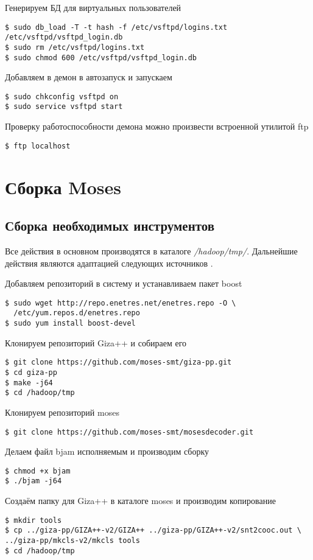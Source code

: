 Генерируем БД для виртуальных пользователей
\begin{lstlisting}
$ sudo db_load -T -t hash -f /etc/vsftpd/logins.txt /etc/vsftpd/vsftpd_login.db
$ sudo rm /etc/vsftpd/logins.txt
$ sudo chmod 600 /etc/vsftpd/vsftpd_login.db
\end{lstlisting}

Добавляем в демон в автозапуск и запускаем
\begin{lstlisting}
$ sudo chkconfig vsftpd on
$ sudo service vsftpd start
\end{lstlisting}

Проверку работоспособности демона можно произвести встроенной утилитой ftp
\begin{lstlisting}
$ ftp localhost
\end{lstlisting}

\section{Сборка Moses}
\subsection{Сборка необходимых инструментов}
Все действия в основном производятся в каталоге \emph{/hadoop/tmp/}. 
Дальнейшие действия являются адаптацией следующих источников \cite{moses:baseline, moses:dev}.

Добавляем репозиторий в систему и устанавливаем пакет boost
\begin{lstlisting}
$ sudo wget http://repo.enetres.net/enetres.repo -O \
  /etc/yum.repos.d/enetres.repo
$ sudo yum install boost-devel
\end{lstlisting}

Клонируем репозиторий Giza++ и собираем его
\begin{lstlisting}
$ git clone https://github.com/moses-smt/giza-pp.git
$ cd giza-pp
$ make -j64
$ cd /hadoop/tmp
\end{lstlisting}

Клонируем репозиторий moses
\begin{lstlisting}
$ git clone https://github.com/moses-smt/mosesdecoder.git
\end{lstlisting}
Делаем файл bjam исполняемым и производим сборку
\begin{lstlisting}
$ chmod +x bjam
$ ./bjam -j64
\end{lstlisting}

Создаём папку для Giza++ в каталоге moses и производим копирование
\begin{lstlisting}
$ mkdir tools
$ cp ../giza-pp/GIZA++-v2/GIZA++ ../giza-pp/GIZA++-v2/snt2cooc.out \
../giza-pp/mkcls-v2/mkcls tools
$ cd /hadoop/tmp
\end{lstlisting}

